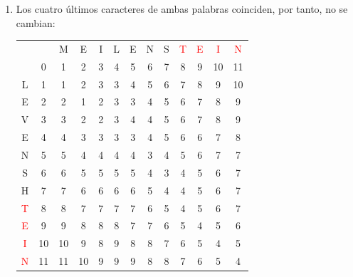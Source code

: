 \documentclass[10pt,a4paper,spanish]{report}
\theoremstyle{definition}
\theoremstyle{remark}
\begin{document}
\begin{enumerate}
    \item Los cuatro últimos caracteres de ambas palabras coinciden, por tanto, no se cambian:
\begin{center}
\begin{tabular}{c|c|c|c|c|c|c|c|c|c|c|c|c|}
\multicolumn{2}{r}{} & \multicolumn{1}{c}{M} & \multicolumn{1}{c}{E} & \multicolumn{1}{c}{I} & \multicolumn{1}{c}{L} & \multicolumn{1}{c}{E} & \multicolumn{1}{c}{N} & \multicolumn{1}{c}{S} & \multicolumn{1}{c}{\textcolor{Red}{T}} & \multicolumn{1}{c}{\textcolor{Red}{E}} & \multicolumn{1}{c}{\textcolor{Red}{I}} & \multicolumn{1}{c}{\textcolor{Red}{N}} \\ 
\cline{2-13} 
& 0 & 1 & 2 & 3 & 4 & 5 & 6 & 7 & 8 & 9 & 10 & 11 \\
\cline{2-13}
L & 1 & 1 & 2 & 3 & 3 & 4 & 5 & 6 & 7 & 8 & 9 & 10 \\
\cline{2-13} 
E & 2 & 2 & 1 & 2 & 3 & 3 & 4 & 5 & 6 & 7 & 8 & 9 \\
\cline{2-13} 
V & 3 & 3 & 2 & 2 & 3 & 4 & 4 & 5 & 6 & 7 & 8 & 9 \\
\cline{2-13} 
E & 4 & 4 & 3 & 3 & 3 & 3 & 4 & 5 & 6 & 6 & 7 & 8 \\
\cline{2-13} 
N & 5 & 5 & 4 & 4 & 4 & 4 & 3 & 4 & 5 & 6 & 7 & 7 \\
\cline{2-13} 
S & 6 & 6 & 5 & 5 & 5 & 5 & 4 & 3 & 4 & 5 & 6 & 7 \\
\cline{2-13} 
H & 7 & 7 & 6 & 6 & 6 & 6 & 5 & 4 & 4 & 5 & 6 & 7 \\
\cline{2-13} 
\textcolor{Red}{T} & 8 & 8 & 7 & 7 & 7 & 7 & 6 & 5 & \cellcolor{Green}4 & 5 & 6 & 7 \\
\cline{2-13}
\textcolor{Red}{E} & 9 & 9 & 8 & 8 & 8 & 7 & 7 & 6 & 5 & \cellcolor{Green}4 & 5 & 6 \\
\cline{2-13} 
\textcolor{Red}{I} & 10 & 10 & 9 & 8 & 9 & 8 & 8 & 7 & 6 & 5 & \cellcolor{Green}4 & 5 \\
\cline{2-13} 
\textcolor{Red}{N} & 11 & 11 & 10 & 9 & 9 & 9 & 8 & 8 & 7 & 6 & 5 & \cellcolor{Green}4 \\
\cline{2-13} 
\end{tabular}
\end{center}


\end{enumerate}
\end{document}
